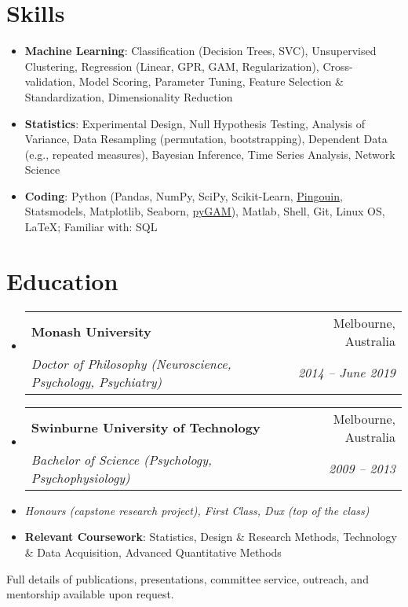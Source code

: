 \documentclass[letterpaper,10pt]{article}
\makeatletter
\newcommand{\resumeSubheading}[4]{
  \vspace{-1pt}\item
    \begin{tabular*}{0.97\textwidth}[t]{l@{\extracolsep{\fill}}r}
      \textbf{#1} & #2 \\
      \textit{\small#3} & \textit{\small #4} \\
    \end{tabular*}\vspace{-5pt}
}
\newcommand{\resumeSubHeadingListStart}{\begin{itemize}[leftmargin=*]}
\newcommand{\resumeSubHeadingListEnd}{\end{itemize}}
\makeatother
\begin{document}
\section{Skills}
 \resumeSubHeadingListStart
   \item{
    \textbf{Machine Learning}{: Classification (Decision Trees, SVC), Unsupervised Clustering, Regression (Linear, GPR, GAM, Regularization), Cross-validation, Model Scoring, Parameter Tuning, Feature Selection \& Standardization, Dimensionality Reduction}
    }
   \item{
    \textbf{Statistics}{: Experimental Design, Null Hypothesis Testing, Analysis of Variance, Data Resampling (permutation, bootstrapping), Dependent Data (e.g., repeated measures), Bayesian Inference, Time Series Analysis, Network Science}
    }
   \item{
    \textbf{Coding}{: Python (Pandas, NumPy, SciPy, Scikit-Learn, \href{https://pingouin-stats.org/}{\underline{Pingouin}}, Statsmodels, Matplotlib, Seaborn, \href{https://pygam.readthedocs.io/en/latest/}{\underline{pyGAM}}), Matlab, Shell, Git, Linux OS, LaTeX; Familiar with: SQL}
    }
 \resumeSubHeadingListEnd


\section{Education}
  \resumeSubHeadingListStart
    \resumeSubheading
      {Monash University}{Melbourne, Australia}
      {Doctor of Philosophy (Neuroscience, Psychology, Psychiatry)}{2014 -- June 2019}
    \resumeSubheading
      {Swinburne University of Technology}{Melbourne, Australia}
      {Bachelor of Science (Psychology, Psychophysiology)}{2009 -- 2013}
      \item[] \textit{Honours (capstone research project), First Class, Dux (top of the class)}
      \item[] \textbf{Relevant Coursework}: Statistics, Design \& Research Methods, Technology \& Data Acquisition, Advanced Quantitative Methods
  \resumeSubHeadingListEnd

\centerline{\small{Full details of publications, presentations, committee service, outreach, and mentorship available upon request.}}

\end{document}
